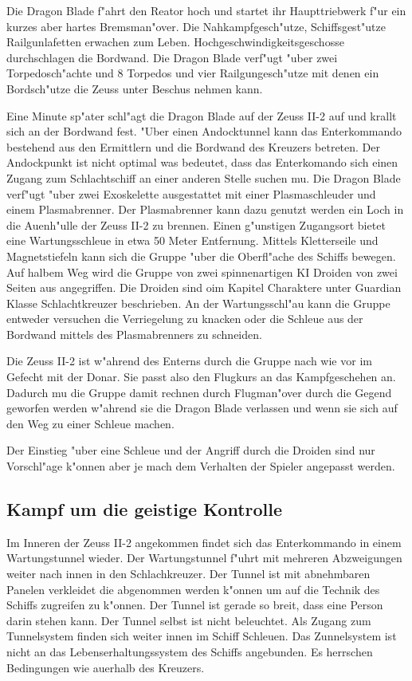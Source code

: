 Die Dragon Blade f"ahrt den Reator hoch und startet ihr Haupttriebwerk f"ur ein kurzes aber hartes Bremsman"over. Die Nahkampfgesch"utze, Schiffsgest"utze Railgunlafetten erwachen zum Leben. Hochgeschwindigkeitsgeschosse durchschlagen die Bordwand. Die Dragon Blade verf"ugt "uber zwei Torpedosch"achte und 8 Torpedos und vier Railgungesch"utze mit denen ein Bordsch"utze die Zeuss unter Beschus\3 nehmen kann. 

Eine Minute sp"ater schl"agt die Dragon Blade auf der Zeuss II-2 auf und krallt sich an der Bordwand fest. "Uber einen Andocktunnel kann das Enterkommando bestehend aus den Ermittlern und \xl{} die Bordwand des Kreuzers betreten. Der Andockpunkt ist nicht optimal was bedeutet, dass das Enterkomando sich einen Zugang zum Schlachtschiff an einer anderen Stelle suchen mu\3. Die Dragon Blade verf"ugt "uber zwei Exoskelette ausgestattet mit einer Plasmaschleuder und einem Plasmabrenner. Der Plasmabrenner kann dazu genutzt werden ein Loch in die Au\3enh"ulle der Zeuss II-2 zu brennen. Einen g"unstigen Zugangsort bietet eine Wartungsschleu\3e in etwa 50 Meter Entfernung. Mittels Kletterseile und Magnetstiefeln kann sich die Gruppe "uber die Oberfl"ache des Schiffs bewegen. Auf halbem Weg wird die Gruppe von zwei spinnenartigen KI Droiden von zwei Seiten aus angegriffen. Die Droiden sind oim Kapitel Charaktere unter Guardian Klasse Schlachtkreuzer beschrieben. An der Wartungsschl"au\3 kann die Gruppe entweder versuchen die Verriegelung zu knacken oder die Schleu\3e aus der Bordwand mittels des Plasmabrenners zu schneiden.

\begin{remarks}
	Die Zeuss II-2 ist w"ahrend des Enterns durch die Gruppe nach wie vor im Gefecht mit der Donar. Sie passt also den Flugkurs an das Kampfgeschehen an. Dadurch mu\3 die Gruppe damit rechnen durch Flugman"over durch die Gegend geworfen werden w"ahrend sie die Dragon Blade verlassen und wenn sie sich auf den Weg zu einer Schleu\3e machen.

	Der Einstieg "uber eine Schleu\3e und der Angriff durch die Droiden sind nur Vorschl"age k"onnen aber je mach dem Verhalten der Spieler angepasst werden.
\end{remarks}

\subsection{Kampf um die geistige Kontrolle}
Im Inneren der Zeuss II-2 angekommen findet sich das Enterkommando in einem Wartungstunnel wieder. Der Wartungstunnel f"uhrt mit mehreren Abzweigungen weiter nach innen in den Schlachkreuzer. Der Tunnel ist mit abnehmbaren Panelen verkleidet die abgenommen werden k"onnen um auf die Technik des Schiffs zugreifen zu k"onnen. Der Tunnel ist gerade so breit, dass eine Person darin stehen kann. Der Tunnel selbst ist nicht beleuchtet. Als Zugang zum Tunnelsystem finden sich weiter innen im Schiff Schleu\3en. Das Zunnelsystem ist nicht an das Lebenserhaltungssystem des Schiffs angebunden. Es herrschen Bedingungen wie au\3erhalb des Kreuzers.

